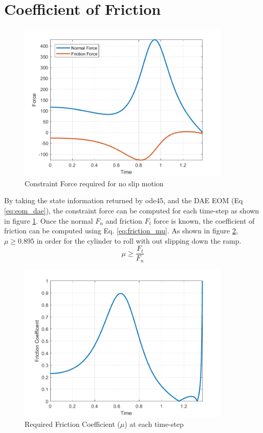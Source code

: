 \documentclass[12pt]{article}
\let\Oldsection\section
\renewcommand{\section}{\FloatBarrier\Oldsection}
\begin{document}
\section{Coefficient of Friction}
\begin{figure}[h]
\centering
\includegraphics[height=3in]{img/constaint_force.png}
\caption{Constraint Force required for no slip motion}
\label{fig:constraint_force}	
\end{figure}

By taking the state information returned by ode45, and the DAE EOM (Eq \ref{eq:eom_dae}),  the constraint force can be computed for each time-step as shown in figure \ref{fig:constraint_force}.
Once the normal $F_n$ and friction $F_t$ force is known, the coefficient of friction can be computed using Eq. \ref{eq:friction_mu}.
As shown in figure \ref{fig:friction_mu}, $\mu \geq 0.895$ in order for the cylinder to roll with out slipping down the ramp.
\begin{equation}\label{eq:friction_mu}
\mu \geq \frac{F_t}{F_n}
\end{equation}

\begin{figure}[h]
\centering
\includegraphics[height=3in]{img/friction_mu.png}
\caption{Required Friction Coefficient ($\mu$) at each time-step}
\label{fig:friction_mu}
\end{figure}
\end{document}
